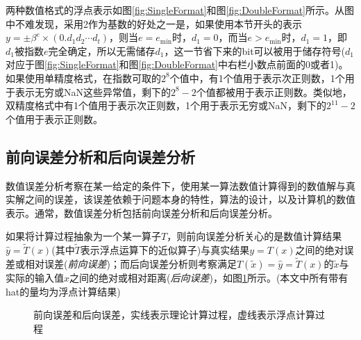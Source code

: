 \documentclass[a4paper,10pt]{ctexart}
\begin{document}
两种数值格式的浮点表示如图\ref{fig:SingleFormat}和图\ref{fig:DoubleFormat}所示。从图中不难发现，采用2作为基数的好处之一是，如果使用本节开头的表示$ y = \pm \beta^e \times (0.d_1d_2\cdots d_t) $，则当$ e = e_{\min} $时，$ d_1=0 $，而当$ e > e_{\min} $时，$ d_1=1 $，即$ d_1 $被指数$ e $完全确定，所以无需储存$ d_1 $，这一节省下来的bit可以被用于储存符号($ d_1 $对应于图\ref{fig:SingleFormat}和图\ref{fig:DoubleFormat}中右栏小数点前面的0或者1)。如果使用单精度格式，在指数可取的$ 2^8 $个值中，有1个值用于表示次正则数，1个用于表示无穷或NaN这些异常值，剩下的$ 2^8-2 $个值都被用于表示正则数。类似地，双精度格式中有1个值用于表示次正则数，1个用于表示无穷或NaN，剩下的$ 2^{11}-2 $个值用于表示正则数。

\subsection{前向误差分析和后向误差分析}
数值误差分析考察在某一给定的条件下，使用某一算法数值计算得到的数值解与真实解之间的误差，该误差依赖于问题本身的特性，算法的设计，以及计算机的数值表示。通常，数值误差分析包括前向误差分析和后向误差分析。

如果将计算过程抽象为一个某一算子$ T $，则前向误差分析关心的是数值计算结果$ \hat{y} = \tilde{T}(x) $(其中$ \tilde{T} $表示浮点运算下的近似算子)与真实结果$ y=T(x) $之间的绝对误差或相对误差(\emph{前向误差})；而后向误差分析则考察满足$ T(\tilde{x}) = \hat{y} = \tilde{T}(x) $的$ \tilde{x} $与实际的输入值$ x $之间的绝对或相对距离(\emph{后向误差})，如图\ref{Backward-Forward}所示。(本文中所有带有hat的量均为浮点计算结果)

\begin{figure}[htpb]
    \centering
    \caption{前向误差和后向误差，实线表示理论计算过程，虚线表示浮点计算过程}
    \label{Backward-Forward}
\end{figure}
\end{document}
